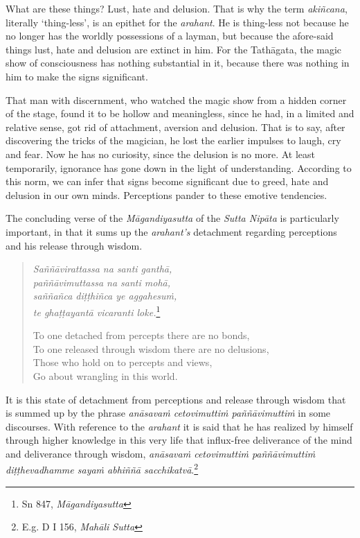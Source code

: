 What are these things? Lust, hate and delusion. That is why the term \emph{akiñcana}, literally `thing-less', is an epithet for the \emph{arahant}. He is thing-less not because he no longer has the worldly possessions of a layman, but because the afore-said things lust, hate and delusion are extinct in him. For the Tathāgata, the magic show of consciousness has nothing substantial in it, because there was nothing in him to make the signs significant.

That man with discernment, who watched the magic show from a hidden corner of the stage, found it to be hollow and meaningless, since he had, in a limited and relative sense, got rid of attachment, aversion and delusion. That is to say, after discovering the tricks of the magician, he lost the earlier impulses to laugh, cry and fear. Now he has no curiosity, since the delusion is no more. At least temporarily, ignorance has gone down in the light of understanding. According to this norm, we can infer that signs become significant due to greed, hate and delusion in our own minds. Perceptions pander to these emotive tendencies.

The concluding verse of the \emph{Māgandiyasutta} of the \emph{Sutta Nipāta} is particularly important, in that it sums up the \emph{arahant's} detachment regarding perceptions and his release through wisdom.

\begin{quote}
\emph{Saññāvirattassa na santi ganthā,}\\
\emph{paññāvimuttassa na santi mohā,}\\
\emph{saññañca diṭṭhiñca ye aggahesuṁ,}\\
\emph{te ghaṭṭayantā vicaranti loke.}\footnote{Sn 847, \emph{Māgandiyasutta}}

To one detached from percepts there are no bonds,\\
To one released through wisdom there are no delusions,\\
Those who hold on to percepts and views,\\
Go about wrangling in this world.
\end{quote}

It is this state of detachment from perceptions and release through wisdom that is summed up by the phrase \emph{anāsavaṁ cetovimuttiṁ paññāvimuttiṁ} in some discourses. With reference to the \emph{arahant} it is said that he has realized by himself through higher knowledge in this very life that influx-free deliverance of the mind and deliverance through wisdom, \emph{anāsavaṁ cetovimuttiṁ paññāvimuttiṁ diṭṭhevadhamme sayaṁ abhiññā sacchikatvā}.\footnote{E.g. D I 156, \emph{Mahāli Sutta}}

